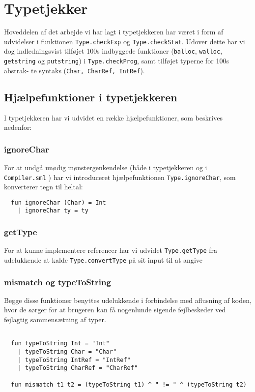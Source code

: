 \documentclass[10pt,a4paper,danish]{article}
\begin{document}
\section{Typetjekker}
Hoveddelen af det arbejde vi har lagt i typetjekkeren har været i form af
udvidelser i funktionen \texttt{Type.checkExp} og \texttt{Type.checkStat}.
 Udover dette har
vi dog indledningsvist tilføjet 100s indbyggede funktioner (\texttt{balloc}, 
\texttt{walloc}, \texttt{getstring} og \texttt{putstring}) i 
\texttt{Type.checkProg}, samt tilføjet typerne for 100s abstrak-
te syntaks (\texttt{Char, CharRef, IntRef}).

\subsection{Hjælpefunktioner i typetjekkeren}
I typetjekkeren har vi udvidet en række hjælpefunktioner, som beskrives nedenfor:  
\subsubsection{ignoreChar} 
For at undgå unødig mønstergenkendelse
(både i typetjekkeren og i \texttt{Compiler.sml}
) har vi introduceret hjælpefunktionen
\texttt{Type.ignoreChar}, som konverterer tegn til heltal:

\begin{verbatim}
  fun ignoreChar (Char) = Int
    | ignoreChar ty = ty
\end{verbatim}

\subsubsection{getType}
For at kunne implementere referencer har vi udvidet \texttt{Type.getType}
fra udelukkende at kalde \texttt{Type.convertType} på sit input til at 
angive 

\subsubsection{mismatch og typeToString}
Begge disse funktioner benyttes udelukkende i forbindelse
med aflusning af koden, hvor de sørger for at brugeren 
kan få nogenlunde sigende fejlbeskeder ved fejlagtig sammensætning
af typer. 

\begin{verbatim}

  fun typeToString Int = "Int"
    | typeToString Char = "Char"
    | typeToString IntRef = "IntRef"
    | typeToString CharRef = "CharRef"

  fun mismatch t1 t2 = (typeToString t1) ^ " != " ^ (typeToString t2)

\end{verbatim}
\end{document}
